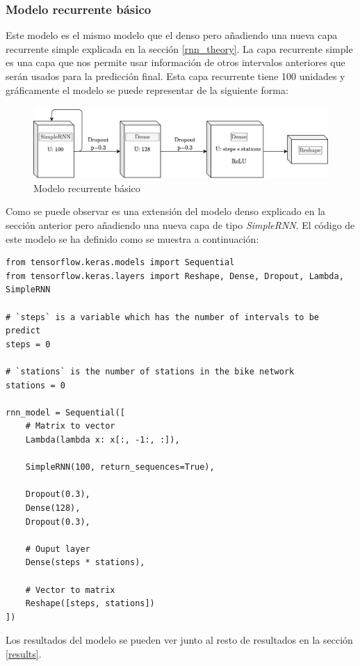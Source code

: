 \subsubsection{Modelo recurrente básico}

Este modelo es el mismo modelo que el denso pero añadiendo una nueva capa recurrente simple explicada en la sección \ref{rnn_theory}. La capa recurrente simple es una capa que nos permite usar información de otros intervalos anteriores que serán usados para la predicción final. Esta capa recurrente tiene 100 unidades y gráficamente el modelo se puede representar de la siguiente forma:
\begin{figure}[H]
    \centering
    \includegraphics[width=12cm]{images/solution/models/simpleRnn.png}
    \caption{Modelo recurrente básico}
    \label{fig:dense-model}
\end{figure}

Como se puede observar es una extensión del modelo denso explicado en la sección anterior pero añadiendo una nueva capa de tipo \textit{SimpleRNN}. El código de este modelo se ha definido como se muestra a continuación:
\begin{verbatim}
from tensorflow.keras.models import Sequential
from tensorflow.keras.layers import Reshape, Dense, Dropout, Lambda, SimpleRNN

# `steps` is a variable which has the number of intervals to be predict
steps = 0 

# `stations` is the number of stations in the bike network
stations = 0

rnn_model = Sequential([
    # Matrix to vector
    Lambda(lambda x: x[:, -1:, :]),
    
    SimpleRNN(100, return_sequences=True),
    
    Dropout(0.3),
    Dense(128),
    Dropout(0.3),
    
    # Ouput layer
    Dense(steps * stations),
    
    # Vector to matrix
    Reshape([steps, stations])
])
\end{verbatim}


Los resultados del modelo se pueden ver junto al resto de resultados en la sección \ref{results}.